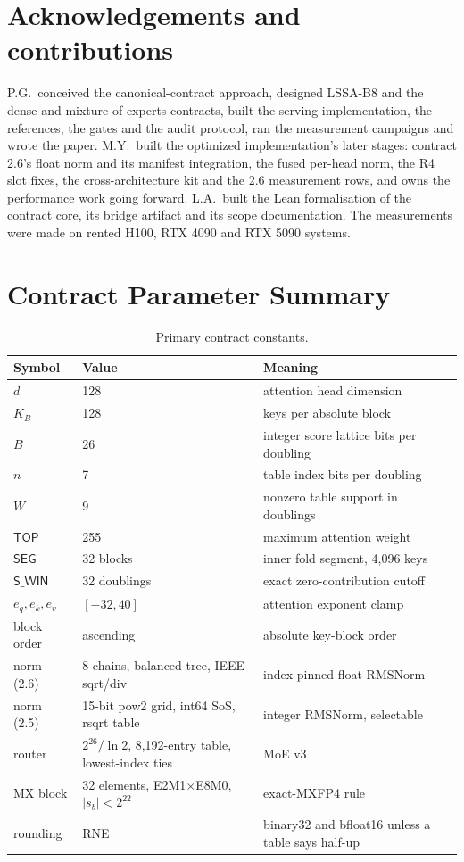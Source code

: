 \documentclass{article}
\begin{document}
\section*{Acknowledgements and contributions}

P.G.\ conceived the canonical-contract approach, designed LSSA-B8 and the dense and
mixture-of-experts contracts, built the serving implementation, the references, the gates and
the audit protocol, ran the measurement campaigns and wrote the paper.  M.Y.\ built the
optimized implementation's later stages: contract 2.6's float norm and its manifest
integration, the fused per-head norm, the R4 slot fixes, the cross-architecture kit and the
2.6 measurement rows, and owns the performance work going forward.  L.A.\ built the Lean
formalisation of the contract core, its bridge artifact and its scope documentation.
The measurements were made on rented H100, RTX 4090 and RTX 5090 systems.

\newpage



\newpage
\appendix

\section{Contract Parameter Summary}
\label{app:parameters}

\begin{table}[ht]
\centering
\small
\begin{tabular}{lll}
\toprule
Symbol & Value & Meaning \\
\midrule
$d$ & 128 & attention head dimension \\
$K_B$ & 128 & keys per absolute block \\
$B$ & 26 & integer score lattice bits per doubling \\
$n$ & 7 & table index bits per doubling \\
$W$ & 9 & nonzero table support in doublings \\
$\mathsf{TOP}$ & 255 & maximum attention weight \\
$\mathsf{SEG}$ & 32 blocks & inner fold segment, 4,096 keys \\
$\mathsf{S\_WIN}$ & 32 doublings & exact zero-contribution cutoff \\
$e_q,e_k,e_v$ & $[-32,40]$ & attention exponent clamp \\
block order & ascending & absolute key-block order \\
norm (2.6) & 8-chains, balanced tree, IEEE sqrt/div & index-pinned float RMSNorm \\
norm (2.5) & 15-bit pow2 grid, int64 SoS, rsqrt table & integer RMSNorm, selectable \\
router & $2^{26}/\ln2$, 8,192-entry table, lowest-index ties & MoE v3 \\
MX block & 32 elements, E2M1$\times$E8M0, $|s_b|<2^{22}$ & exact-MXFP4 rule \\
rounding & RNE & binary32 and bfloat16 unless a table says half-up \\
\bottomrule
\end{tabular}
\caption{Primary contract constants.}
\end{table}
\end{document}
